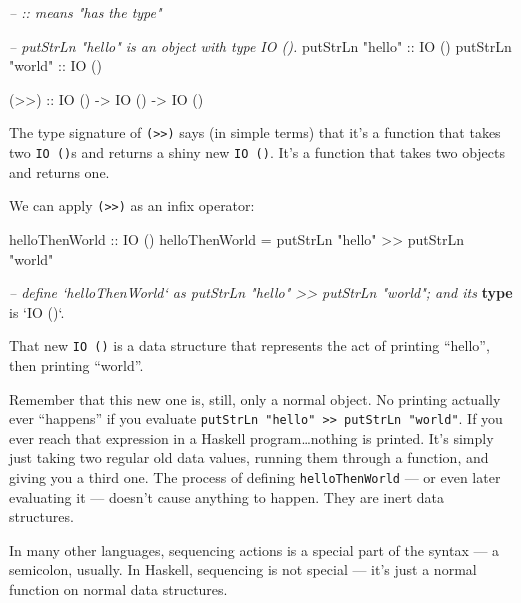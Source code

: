 \documentclass[]{article}
\newenvironment{Shaded}{}{}
\newcommand{\KeywordTok}[1]{\textcolor[rgb]{0.00,0.44,0.13}{\textbf{{#1}}}}
\newcommand{\DataTypeTok}[1]{\textcolor[rgb]{0.56,0.13,0.00}{{#1}}}
\newcommand{\StringTok}[1]{\textcolor[rgb]{0.25,0.44,0.63}{{#1}}}
\newcommand{\CommentTok}[1]{\textcolor[rgb]{0.38,0.63,0.69}{\textit{{#1}}}}
\newcommand{\OtherTok}[1]{\textcolor[rgb]{0.00,0.44,0.13}{{#1}}}
\newcommand{\FunctionTok}[1]{\textcolor[rgb]{0.02,0.16,0.49}{{#1}}}
\newcommand{\NormalTok}[1]{{#1}}
\begin{document}
\begin{Shaded}
\begin{Highlighting}[]
\CommentTok{-- :: means "has the type"}

\CommentTok{-- putStrLn "hello" is an object with type IO ().}
\NormalTok{putStrLn }\StringTok{"hello"}\OtherTok{ ::} \DataTypeTok{IO} \NormalTok{()}
\NormalTok{putStrLn }\StringTok{"world"}\OtherTok{ ::} \DataTypeTok{IO} \NormalTok{()}

\OtherTok{(>>) ::} \DataTypeTok{IO} \NormalTok{() }\OtherTok{->} \DataTypeTok{IO} \NormalTok{() }\OtherTok{->} \DataTypeTok{IO} \NormalTok{()}
\end{Highlighting}
\end{Shaded}

The type signature of \texttt{(\textgreater{}\textgreater{})} says (in
simple terms) that it's a function that takes two \texttt{IO\ ()}s and
returns a shiny new \texttt{IO\ ()}. It's a function that takes two
objects and returns one.

We can apply \texttt{(\textgreater{}\textgreater{})} as an infix
operator:

\begin{Shaded}
\begin{Highlighting}[]
\OtherTok{helloThenWorld ::} \DataTypeTok{IO} \NormalTok{()}
\NormalTok{helloThenWorld }\FunctionTok{=} \NormalTok{putStrLn }\StringTok{"hello"} \FunctionTok{>>} \NormalTok{putStrLn }\StringTok{"world"}

\CommentTok{-- define `helloThenWorld` as putStrLn "hello" >> putStrLn "world"; and its}
\KeywordTok{type} \NormalTok{is }\OtherTok{`IO ()`}\FunctionTok{.}
\end{Highlighting}
\end{Shaded}

That new \texttt{IO\ ()} is a data structure that represents the act of
printing ``hello'', then printing ``world''.

Remember that this new one is, still, only a normal object. No printing
actually ever ``happens'' if you evaluate
\texttt{putStrLn\ "hello"\ \textgreater{}\textgreater{}\ putStrLn\ "world"}.
If you ever reach that expression in a Haskell program\ldots{}nothing is
printed. It's simply just taking two regular old data values, running
them through a function, and giving you a third one. The process of
defining \texttt{helloThenWorld} --- or even later evaluating it ---
doesn't cause anything to happen. They are inert data structures.

In many other languages, sequencing actions is a special part of the
syntax --- a semicolon, usually. In Haskell, sequencing is not special
--- it's just a normal function on normal data structures.
\end{document}
